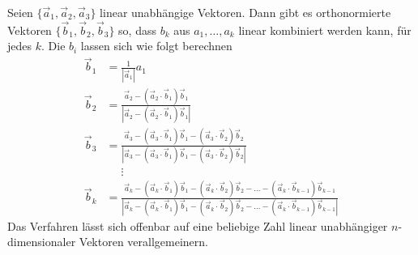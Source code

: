 \begin{satz}
\label{satz-gram-schmidt}
Seien $\{\vec a_1,\vec a_2,\vec a_3\}$ linear unabhängige Vektoren.
Dann gibt es orthonormierte Vektoren $\{\vec b_1,\vec b_2,\vec b_3\}$ so,
dass $b_k$ aus $a_1,\dots,a_k$ linear kombiniert werden kann, für jedes $k$.
Die $b_i$ lassen sich wie folgt berechnen
\begin{align*}
\vec b_1&=\frac1{|\vec a_1|}a_1\\
\vec b_2&=
\frac{
\vec a_2-(\vec a_2\cdot \vec b_1)\vec b_1
}{
|\vec a_2-(\vec a_2\cdot \vec b_1)\vec b_1|
}
\\
\vec b_3
&=
\frac{
\vec a_3-(\vec a_3\cdot \vec b_1)\vec b_1-(\vec a_3\cdot\vec b_2)\vec b_2
}{
|
\vec a_3-(\vec a_3\cdot \vec b_1)\vec b_1-(\vec a_3\cdot\vec b_2)\vec b_2
|
}
\\
&\phantom{=}\vdots\\
\vec b_k&=\frac{\vec a_k-(\vec a_k\cdot \vec b_1)\vec b_1-(\vec a_k\cdot \vec b_2)\vec b_2-\dots-(\vec a_k\cdot \vec b_{k-1})\vec b_{k-1}}{|\vec a_k-(\vec a_k\cdot \vec b_1)\vec b_1-(\vec a_k\cdot \vec b_2)\vec b_2-\dots-(\vec a_k\cdot \vec b_{k-1})\vec b_{k-1}|}
\end{align*}
Das Verfahren lässt sich offenbar auf eine beliebige Zahl linear
unabhängiger $n$-dimensionaler Vektoren verallgemeinern.
\end{satz}

